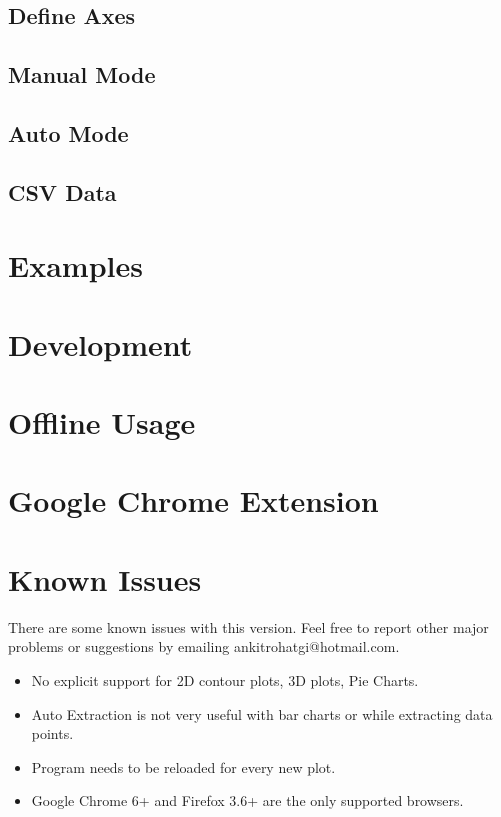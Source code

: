 \documentclass[letterpaper, 11pt]{article}
\begin{document}
\subsection{Define Axes}

\subsection{Manual Mode}

\subsection{Auto Mode}

\subsection{CSV Data}

\section{Examples}

\section{Development}

\section{Offline Usage}

\section{Google Chrome Extension}

\section{Known Issues}

There are some known issues with this version. Feel free to report other major problems or suggestions by emailing ankitrohatgi@hotmail.com.

\begin{itemize}
\item{No explicit support for 2D contour plots, 3D plots, Pie Charts.}
\item{Auto Extraction is not very useful with bar charts or while extracting data points.}
\item{Program needs to be reloaded for every new plot.}
\item{Google Chrome 6+ and Firefox 3.6+ are the only supported browsers.}
\end{itemize}
\end{document}
